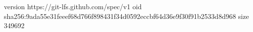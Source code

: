 version https://git-lfs.github.com/spec/v1
oid sha256:9ada55e31feeef68d766f898431f34d0592eccbf64d36e9f30f91b2533d8d968
size 349692
